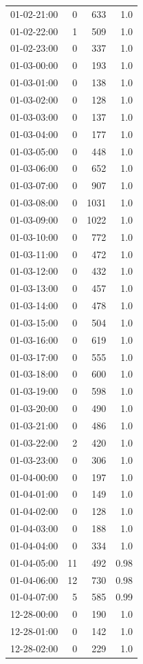 \documentclass[11pt]{article}
\begin{document}
\begin{enumerate}
\begin{table}[htbp]
\begin{tabular}{rrrr}
01-02-21:00 & 0 & 633 & 1.0\\
01-02-22:00 & 1 & 509 & 1.0\\
01-02-23:00 & 0 & 337 & 1.0\\
01-03-00:00 & 0 & 193 & 1.0\\
01-03-01:00 & 0 & 138 & 1.0\\
01-03-02:00 & 0 & 128 & 1.0\\
01-03-03:00 & 0 & 137 & 1.0\\
01-03-04:00 & 0 & 177 & 1.0\\
01-03-05:00 & 0 & 448 & 1.0\\
01-03-06:00 & 0 & 652 & 1.0\\
01-03-07:00 & 0 & 907 & 1.0\\
01-03-08:00 & 0 & 1031 & 1.0\\
01-03-09:00 & 0 & 1022 & 1.0\\
01-03-10:00 & 0 & 772 & 1.0\\
01-03-11:00 & 0 & 472 & 1.0\\
01-03-12:00 & 0 & 432 & 1.0\\
01-03-13:00 & 0 & 457 & 1.0\\
01-03-14:00 & 0 & 478 & 1.0\\
01-03-15:00 & 0 & 504 & 1.0\\
01-03-16:00 & 0 & 619 & 1.0\\
01-03-17:00 & 0 & 555 & 1.0\\
01-03-18:00 & 0 & 600 & 1.0\\
01-03-19:00 & 0 & 598 & 1.0\\
01-03-20:00 & 0 & 490 & 1.0\\
01-03-21:00 & 0 & 486 & 1.0\\
01-03-22:00 & 2 & 420 & 1.0\\
01-03-23:00 & 0 & 306 & 1.0\\
01-04-00:00 & 0 & 197 & 1.0\\
01-04-01:00 & 0 & 149 & 1.0\\
01-04-02:00 & 0 & 128 & 1.0\\
01-04-03:00 & 0 & 188 & 1.0\\
01-04-04:00 & 0 & 334 & 1.0\\
01-04-05:00 & 11 & 492 & 0.98\\
01-04-06:00 & 12 & 730 & 0.98\\
01-04-07:00 & 5 & 585 & 0.99\\
12-28-00:00 & 0 & 190 & 1.0\\
12-28-01:00 & 0 & 142 & 1.0\\
12-28-02:00 & 0 & 229 & 1.0\\

\end{tabular}
\end{table}
\end{enumerate}
\end{document}
